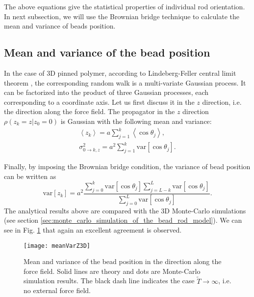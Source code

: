 The above equations give the statistical properties of individual rod orientation. In next subsection, we will use the Brownian bridge technique to calculate the mean and variance of beads position.

\subsection{Mean and variance of the bead position}
\label{sub:mean_and_variance_of_bead_position}
In the case of 3D pinned polymer, according to Lindeberg-Feller central limit theorem \cite{Feller2008,Athreya2006}, the corresponding random walk is a multi-variate Gaussian process. It can be factorized into the product of three Gaussian processes, each corresponding to a coordinate axis. Let us first discuss it in the $z$ direction, i.e. the direction along the force field. The propagator in the $z$ direction $\rho(z_k = z| z_0 = 0)$ is Gaussian with the following mean and variance:
\begin{equation}
    \begin{aligned}
    \label{eq:meanVarRod3D}
    \left<z_k\right> = a\sum_{j=1}^k\left<\cos\theta_j\right>, \\
    \sigma_{0 \rightarrow k,z}^2 = a^2\sum_{j=1}^k\text{var}\left[\cos\theta_j\right].
    \end{aligned}
\end{equation}

Finally, by imposing the Brownian bridge condition, the variance of bead position can be written as 
\begin{equation}
    \label{eq:varBrownianBridge3D}
    \text{var}\left[z_k\right] = a^2\frac{\sum_{j=0}^{k}\text{var}\left[\cos\theta_j\right]\sum_{j=L-k}^{L}\text{var}\left[\cos\theta_j\right]}{\sum_{j=0}^{L}\text{var}\left[\cos\theta_j\right]}.
\end{equation}
The analytical results above are compared with the 3D Monte-Carlo simulations (see section \ref{sec:monte_carlo_simulation_of_the_bead_rod_model}). We can see in Fig. \ref{fig:meanVarZ3D} that again an excellent agreement is observed. 

\begin{figure}[htpb]
    \centering
    \texttt{[image: meanVarZ3D]}
    \caption{Mean and variance of the bead position in the direction along the force field. Solid lines are theory and dots are Monte-Carlo simulation results. The black dash line indicates the case $\tilde{T}\rightarrow\infty$, i.e. no external force field.}
    \label{fig:meanVarZ3D}
\end{figure}

